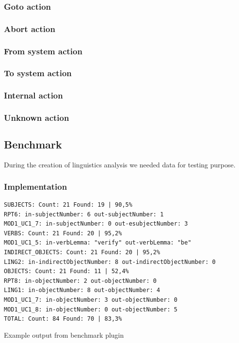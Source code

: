 \subsubsection{Goto action}

\subsubsection{Abort action}

\subsubsection{From system action}

\subsubsection{To system action}

\subsubsection{Internal action}

\subsubsection{Unknown action}

\subsection{Benchmark}
\label{sec:benchmark}

During the creation of linguistics analysis we needed data for testing purpose.



\subsubsection{Implementation}

\begin{table}[ht]   %
\begin{center}
    \begin{verbatim}
SUBJECTS: Count: 21 Found: 19 | 90,5%
RPT6: in-subjectNumber: 6 out-subjectNumber: 1
MOD1_UC1_7: in-subjectNumber: 0 out-esubjectNumber: 3
VERBS: Count: 21 Found: 20 | 95,2%
MOD1_UC1_5: in-verbLemma: "verify" out-verbLemma: "be"
INDIRECT_OBJECTS: Count: 21 Found: 20 | 95,2%
LING2: in-indirectObjectNumber: 8 out-indirectObjectNumber: 0
OBJECTS: Count: 21 Found: 11 | 52,4%
RPT8: in-objectNumber: 2 out-objectNumber: 0
LING1: in-objectNumber: 8 out-objectNumber: 4
MOD1_UC1_7: in-objectNumber: 3 out-objectNumber: 0
MOD1_UC1_8: in-objectNumber: 0 out-objectNumber: 5
TOTAL: Count: 84 Found: 70 | 83,3%   
    \end{verbatim}
  \caption{Example output from benchmark plugin}
  \label{tab.benchmarkexample}
\end{center}
\end{table}   
      
